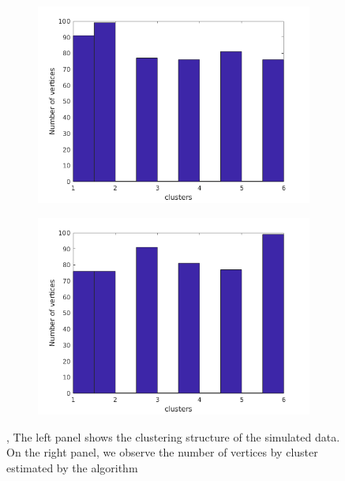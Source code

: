 \documentclass[11pt,letter]{article}%
\numberwithin{equation}{section}
\begin{document}
\begin{figure}[!h]
    \centering
    \begin{subfigure}[b]{0.45\textwidth}
            \centering
            \includegraphics[width=\textwidth]{../original_6.png}
    \label{fig:fig1}
    \end{subfigure}
\begin{subfigure}[b]{0.45\textwidth}
            \centering
            \includegraphics[width=\textwidth]{../estimated.png}
    \label{fig:fig2}
    \end{subfigure}
    \caption{\protect{}, The left panel  shows the clustering structure of the simulated data. On the  right panel, \protect{} we observe the number of vertices by cluster estimated by the algorithm}
\end{figure}
\end{document}
